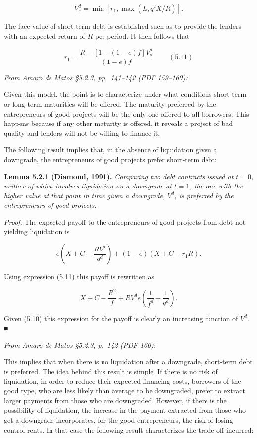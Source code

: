 \documentclass[11pt,a4paper]{article}
\begin{document}
\[V_s^d = \min\left[r_1, \max(L, q^d X/R)\right].\]

The face value of short-term debt is established such as to provide the lenders with an expected
return of \(R\) per period. It then follows that

\[r_1 = \frac{R - [1 - (1 - e)f]V_s^d}{(1 - e)f}. \qquad (5.11)\]

\emph{From Amaro de Matos §5.2.3, pp.~141--142 (PDF 159--160):}

Given this model, the point is to characterize under what conditions short-term or long-term
maturities will be offered. The maturity preferred by the entrepreneurs of good projects will be the
only one offered to all borrowers. This happens because if any other maturity is offered, it reveals
a project of bad quality and lenders will not be willing to finance it.

The following result implies that, in the absence of liquidation given a downgrade, the
entrepreneurs of good projects prefer short-term debt:

\textbf{Lemma 5.2.1 (Diamond, 1991).} \emph{Comparing two debt contracts issued at \(t = 0\),
neither of which involves liquidation on a downgrade at \(t = 1\), the one with the higher value at
that point in time given a downgrade, \(V^d\), is preferred by the entrepreneurs of good projects.}

\emph{Proof.} The expected payoff to the entrepreneurs of good projects from debt not yielding
liquidation is

\[e\left(X + C - \frac{RV^d}{q^d}\right) + (1 - e)(X + C - r_1 R).\]

Using expression (5.11) this payoff is rewritten as

\[X + C - \frac{R^2}{f} + RV^d e\left(\frac{1}{f^d} - \frac{1}{q^d}\right).\]

Given (5.10) this expression for the payoff is clearly an increasing function of \(V^d\). ■

\emph{From Amaro de Matos §5.2.3, p.~142 (PDF 160):}

This implies that when there is no liquidation after a downgrade, short-term debt is preferred. The
idea behind this result is simple. If there is no risk of liquidation, in order to reduce their
expected financing costs, borrowers of the good type, who are less likely than average to be
downgraded, prefer to extract larger payments from those who are downgraded. However, if there is
the possibility of liquidation, the increase in the payment extracted from those who get a downgrade
incorporates, for the good entrepreneurs, the risk of losing control rents. In that case the
following result characterizes the trade-off incurred:
\end{document}
